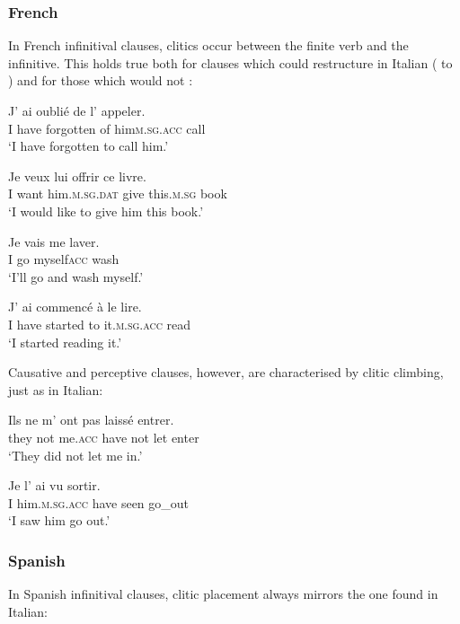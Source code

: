 \documentclass[output=paper,modfonts,nonflat,newtxmath]{langsci/langscibook}
\begin{document}
\subsubsection{French} %

In French infinitival clauses, clitics occur between the finite verb and the infinitive. This holds true both for clauses which could restructure in Italian ( to ) and for those which would not :

\ea \label{ex:sciutti:16}
    \gll J’ ai oublié de l’ appeler.\\
         I have forgotten of him\textsc{m.sg.acc} call \\
    \glt  ‘I have forgotten to call him.’
\z

\ea \label{ex:sciutti:17}
    \gll Je veux lui offrir ce livre.\\
         I want him.\textsc{m.sg.dat} give   this.\textsc{m.sg} book \\
    \glt  ‘I would like to give him this book.’
\z

\ea \label{ex:sciutti:18}
    \gll Je vais me laver.\\
         I go myself\textsc{acc} wash\\
    \glt  ‘I’ll go and wash myself.’
\z

\ea \label{ex:sciutti:19}
    \gll J’ ai commencé à le lire.\\
         I have started to it.\textsc{m.sg.acc}    read\\
    \glt  ‘I started reading it.’
\z

Causative and perceptive clauses, however, are characterised by clitic climbing, just as in Italian:

\ea \label{ex:sciutti:20}
    \gll Ils ne m’ ont pas laissé entrer.\\
         they not me.\textsc{acc} have not let enter \\
    \glt  ‘They did not let me in.’
\z

\ea \label{ex:sciutti:21}
    \gll Je l’ ai vu sortir.\\
         I him.\textsc{m.sg.acc} have seen go\_out \\
    \glt  ‘I saw him go out.’
\z

\subsubsection{Spanish} %

In Spanish infinitival clauses, clitic placement always mirrors the one found in Italian:
\end{document}
